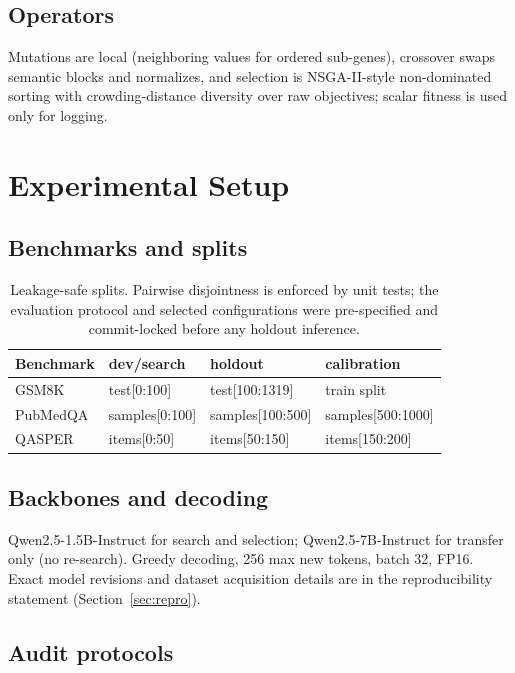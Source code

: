 \documentclass[11pt]{article}
\begin{document}
\subsection{Operators}

Mutations are local (neighboring values for ordered sub-genes), crossover
swaps semantic blocks and normalizes, and selection is NSGA-II-style
non-dominated sorting with crowding-distance diversity over raw objectives;
scalar fitness is used only for logging.

\section{Experimental Setup}

\subsection{Benchmarks and splits}

\begin{table}[h]
\centering\small
\begin{tabular}{@{}llll@{}}
\toprule
Benchmark & dev/search & holdout & calibration \\
\midrule
GSM8K & test[0:100] & test[100:1319] & train split \\
PubMedQA & samples[0:100] & samples[100:500] & samples[500:1000] \\
QASPER & items[0:50] & items[50:150] & items[150:200] \\
\bottomrule
\end{tabular}
\caption{Leakage-safe splits. Pairwise disjointness is enforced by unit
tests; the evaluation protocol and selected configurations were pre-specified
and commit-locked before any holdout inference.}
\label{tab:splits}
\end{table}

\subsection{Backbones and decoding}

Qwen2.5-1.5B-Instruct for search and selection; Qwen2.5-7B-Instruct for
transfer only (no re-search). Greedy decoding, 256 max new tokens, batch 32,
FP16. Exact model revisions and dataset acquisition details are in the
reproducibility statement (Section~\ref{sec:repro}).

\subsection{Audit protocols}
\end{document}
